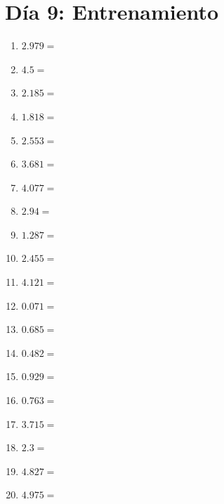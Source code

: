 \documentclass[12pt]{article}
\begin{document}
\section*{Día 9: Entrenamiento}
\begin{enumerate}
\item \large $ 2.979 = $ \vspace{1.5cm}
\item \large $ 4.5 = $ \vspace{1.5cm}
\item \large $ 2.185 = $ \vspace{1.5cm}
\item \large $ 1.818 = $ \vspace{1.5cm}
\item \large $ 2.553 = $ \vspace{1.5cm}
\item \large $ 3.681 = $ \vspace{1.5cm}
\item \large $ 4.077 = $ \vspace{1.5cm}
\item \large $ 2.94 = $ \vspace{1.5cm}
\item \large $ 1.287 = $ \vspace{1.5cm}
\item \large $ 2.455 = $ \vspace{1.5cm}
\newpage
\item \large $ 4.121 = $ \vspace{1.5cm}
\item \large $ 0.071 = $ \vspace{1.5cm}
\item \large $ 0.685 = $ \vspace{1.5cm}
\item \large $ 0.482 = $ \vspace{1.5cm}
\item \large $ 0.929 = $ \vspace{1.5cm}
\item \large $ 0.763 = $ \vspace{1.5cm}
\item \large $ 3.715 = $ \vspace{1.5cm}
\item \large $ 2.3 = $ \vspace{1.5cm}
\item \large $ 4.827 = $ \vspace{1.5cm}
\item \large $ 4.975 = $ \vspace{1.5cm}

\end{enumerate}
\end{document}
